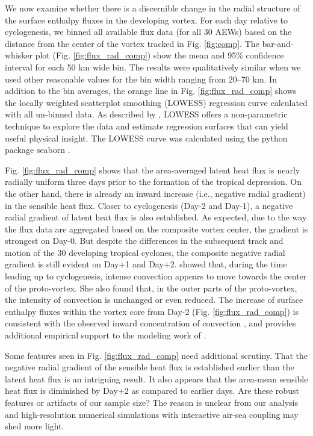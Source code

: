 \documentclass[draft]{agujournal2019}
\begin{document}
We now examine whether there is a discernible change in the radial structure of the surface enthalpy fluxes in the developing vortex. For each day relative to cyclogenesis, we binned all available flux data (for all 30 AEWs) based on the distance from the center of the vortex tracked in Fig. \ref{fig:comp}. 
The bar-and-whisker plot (Fig. \ref{fig:flux_rad_comp}) show the mean and 
95\% confidence interval for each 50 km wide bin.  The results were qualitatively similar when we used other reasonable values for the bin width ranging from 20--70 km. In addition to the bin averages, the orange line in Fig. \ref{fig:flux_rad_comp} shows the locally weighted scatterplot smoothing (LOWESS) regression curve calculated with all un-binned data. As described by , LOWESS offers a non-parametric technique to explore the data and estimate regression surfaces that can yield useful physical insight. The LOWESS curve was calculated using the python package seaborn \cite{Waskom2021}.
 

Fig. \ref{fig:flux_rad_comp} shows that the area-averaged latent heat flux is nearly radially uniform three days prior to the formation of the tropical depression. On the other hand, there is already an inward increase  (i.e., negative radial gradient) in the sensible heat flux. Closer to cyclogenesis (Day-2 and Day-1), a negative radial gradient of latent heat flux is also established. As expected, due to the way the flux data are aggregated based on the composite vortex center, the gradient is strongest on Day-0. But despite the differences in the subsequent track and motion of the 30 developing tropical cyclones, the composite negative radial gradient is still evident on  Day+1 and Day+2.  showed that, during the time leading up to cyclogenesis, intense convection appears to move towards the center of the proto-vortex. She also found that, in the outer parts of the proto-vortex, the intensity of convection is unchanged or even reduced. The increase of surface enthalpy fluxes within the vortex core from Day-2 (Fig. \ref{fig:flux_rad_comp}) is consistent with the observed inward concentration of convection \cite{WZ2018}, and provides additional empirical support to the modeling work of . 

Some features seen in Fig. \ref{fig:flux_rad_comp} need additional scrutiny. That the negative radial gradient of the sensible heat flux is established earlier than the latent heat flux is an intriguing result.  It also appears that the area-mean sensible heat flux is diminished by Day+2 as compared to earlier days. Are these robust features or artifacts of our sample size?  The reason is unclear from our analysis and high-resolution numerical simulations with interactive air-sea coupling may shed more light. 
\end{document}
